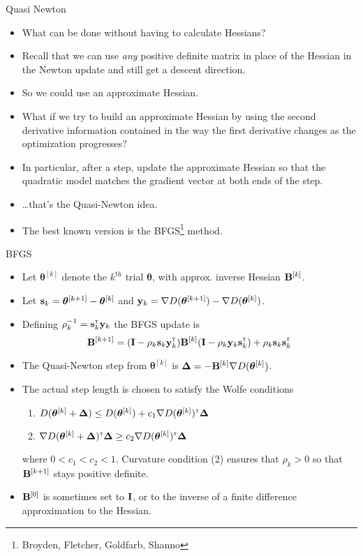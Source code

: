 \documentclass{beamer}
\newcommand{\ts}{^{\mbox{\sf \tiny T}}}
\begin{document}
\begin{frame}{Quasi Newton}
\begin{itemize}
\item What can be done without having to calculate Hessians?
\item Recall that we can use {\em any} positive definite matrix in place of the Hessian in the Newton update and still get a descent direction. 
\item So we could use an approximate Hessian. 
\item What if we try to build an approximate Hessian by using the second derivative information contained in the way the first derivative changes as the optimization progresses? 
\item In particular, after a step, update the approximate Hessian so that the quadratic model matches the gradient vector at both ends of the step.   
\item \ldots that's the Quasi-Newton idea. 
\item The best known version is the BFGS\footnote{Broyden, Fletcher, Goldfarb, Shanno} method. 
\end{itemize}
\end{frame}

\begin{frame}{BFGS}
\begin{itemize}
\item Let ${\bm \theta}^{[k]}$ denote the $k^\text{th}$ trial $\bm \theta$, with approx. inverse Hessian ${\bf B}^{[k]}$.
\item Let ${\bf s}_k = {\bm \theta}^{[k+1]} -{\bm \theta}^{[k]} $ and ${\bf y}_k = \nabla D({\bm \theta}^{[k+1]}) - \nabla D({\bm \theta}^{[k]})$.
\item Defining $\rho_k^{-1} = {\bf s}_k\ts {\bf y}_k$ the BFGS update is
$$
{\bf B}^{[k+1]} = ({\bf I} - \rho_k {\bf s}_k {\bf y}_k\ts){\bf B}^{[k]}({\bf I} - \rho_k {\bf y}_k {\bf s}_k\ts)
+ \rho_k {\bf s}_k {\bf s}_k\ts
$$
\item The Quasi-Newton step from ${\bm \theta}^{[k]}$ is ${\bm \Delta} = - {\bf B}^{[k]} \nabla D({\bm \theta}^{[k]})$.
\item The actual step length is chosen to satisfy the Wolfe conditions
\begin{enumerate}
\item $D({\bm \theta}^{[k]}+{\bm \Delta}) \le D({\bm \theta}^{[k]}) + c_1 \nabla D({\bm \theta}^{[k]})\ts {\bm \Delta}$
\item $\nabla D({\bm \theta}^{[k]}+{\bm \Delta})\ts {\bm \Delta} \ge c_2 \nabla D({\bm \theta}^{[k]})\ts {\bm \Delta}$
\end{enumerate}
where $0<c_1<c_2<1$. Curvature condition (2) ensures that $\rho_k>0$ so that ${\bf B}^{[k+1]}$ stays positive definite.

\item ${\bf B}^{[0]}$ is sometimes set to $\bf I$, or to the inverse of a finite difference approximation to the Hessian. \end{itemize}
\end{frame}
\end{document}
